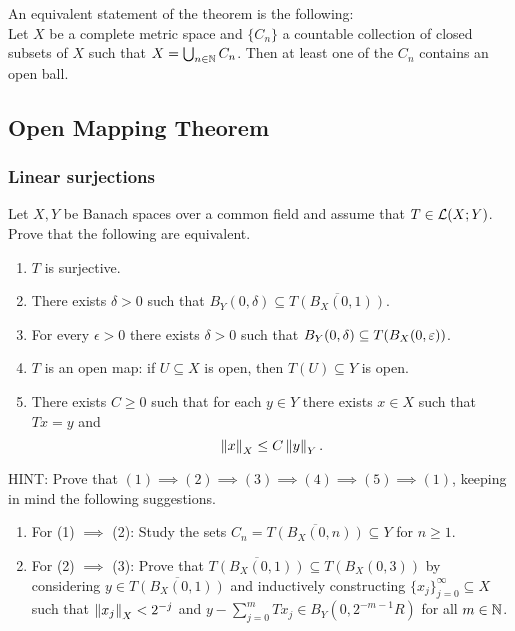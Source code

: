 \documentclass[a4paper]{article}
\begin{document}
\begin{remark}
    An equivalent statement of the theorem is the following: \\
    Let $X$ be a complete metric space and $\{C_n\}$ a countable collection of closed subsets of $X$ such that $X = \bigcup_{n \in \mathbb{N}} C_n $. Then at least one of the $C_n$ contains an open ball.
\end{remark}

\subsection{Open Mapping Theorem}

\subsubsection*{Linear surjections}

\begin{thm}
Let $X,Y$ be Banach spaces over a common field and assume that $T \in \mathcal{L}(X;Y)$.  Prove that the following are equivalent.
\begin{enumerate}
 \item $T$ is surjective.
 
 \item There exists $\delta >0$ such that $B_Y(0,\delta) \subseteq \overline{T(B_X(0,1))}$.
 
 \item For every $\epsilon >0$ there exists $\delta >0$ such that $B_Y(0,\delta) \subseteq T(B_X(0,\varepsilon))$.
 
 \item $T$ is an open map: if $U\subseteq X$ is open, then $T(U) \subseteq Y$ is open.

  \item There exists $C \ge 0$ such that for each $y \in Y$ there exists $x \in X$ such that $Tx=y$ and 
\begin{equation*}
 \left\lVert x\right\rVert_X \le C \left\lVert y\right\rVert_Y.
\end{equation*}
\end{enumerate}
HINT: Prove that  $(1) \implies (2) \implies (3) \implies (4) \implies (5)  \implies (1)$, keeping in mind the following suggestions.  
\begin{enumerate}
 \item For (1) $\implies$ (2): Study the sets $C_n = \overline{T(B_X(0,n))} \subseteq Y$ for $n \ge 1$.
 \item For (2) $\implies$ (3):  Prove that $\overline{T(B_X(0,1)  )} \subseteq T(B_X(0,3))$ by considering $y \in\overline{T(B_X(0,1)  )}$ and  inductively constructing $\{x_j\}_{j=0}^\infty \subseteq X$ such that $\left\lVert x_j\right\rVert_X < 2^{-j}$ and $y - \sum_{j=0}^m T x_j \in B_Y(0,2^{-m-1} R)$  for all $m \in \mathbb{N}$.
\end{enumerate}
\end{thm}
\end{document}

